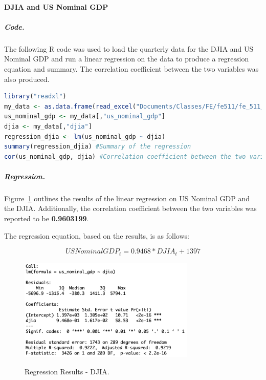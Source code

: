 \documentclass[11pt]{article}
\numberwithin{equation}{section}
\begin{document}
\paragraph{DJIA and US Nominal GDP}

\subparagraph{Code.}
The following R code was used to load the quarterly data for the DJIA and US Nominal GDP and run a linear regression on the data to produce a regression equation and summary. The correlation coefficient between the two variables was also produced.

\vspace{3mm}
\begin{lstlisting}[language=R]
library("readxl")
my_data <- as.data.frame(read_excel("Documents/Classes/FE/fe511/fe_511_final_project/fe_511_data.xlsx"))
us_nominal_gdp <- my_data[,"us_nominal_gdp"]
djia <- my_data[,"djia"]
regression_djia <- lm(us_nominal_gdp ~ djia)
summary(regression_djia) #Summary of the regression
cor(us_nominal_gdp, djia) #Correlation coefficient between the two variables
\end{lstlisting}
\vspace{3mm}

\subparagraph{Regression.}
Figure~\ref{fig:model2} outlines the results of the linear regression on US Nominal GDP and the DJIA. Additionally, the correlation coefficient between the two variables was reported to be \textbf{0.9603199}.

The regression equation, based on the results, is as follows:

\[ US Nominal GDP_{t} = 0.9468*DJIA_{t} + 1397 \]

\begin{figure}
	\begin{center}
		{\includegraphics[width=0.75\textwidth]{regression_results_djia.png}}
	\end{center}
	\caption{Regression Results - DJIA.}
	\label{fig:model2}
\end{figure}
\end{document}
